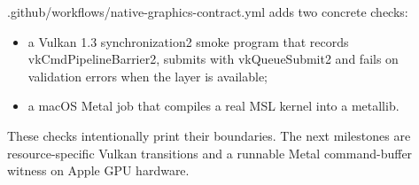 \hypertarget{appendix-1680333ac796-current-branch}{}

.github/workflows/native-graphics-contract.yml adds two concrete checks:

\begin{itemize}
\tightlist
\item
  a Vulkan 1.3 synchronization2 smoke program that records vkCmdPipelineBarrier2, submits with vkQueueSubmit2 and fails on validation errors when the layer is available;
\item
  a macOS Metal job that compiles a real MSL kernel into a metallib.
\end{itemize}

These checks intentionally print their boundaries. The next milestones are resource-specific Vulkan transitions and a runnable Metal command-buffer witness on Apple GPU hardware.
